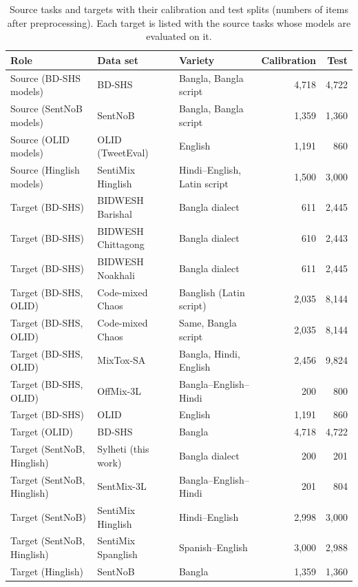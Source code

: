 \begin{table}[t]
\centering
\small
\caption{Source tasks and targets with their calibration and test splits (numbers of items after preprocessing).
Each target is listed with the source tasks whose models are evaluated on it.}
\label{tab:data}
\small
\setlength{\tabcolsep}{3.5pt}
\begin{tabular}{lllrr}
\toprule
Role & Data set & Variety & Calibration & Test \\
\midrule
Source (BD-SHS models) & BD-SHS & Bangla, Bangla script & 4{,}718 & 4{,}722 \\
Source (SentNoB models) & SentNoB & Bangla, Bangla script & 1{,}359 & 1{,}360 \\
Source (OLID models) & OLID (TweetEval) & English & 1{,}191 & 860 \\
Source (Hinglish models) & SentiMix Hinglish & Hindi--English, Latin script & 1{,}500 & 3{,}000 \\
\midrule
Target (BD-SHS) & BIDWESH Barishal & Bangla dialect & 611 & 2{,}445 \\
Target (BD-SHS) & BIDWESH Chittagong & Bangla dialect & 610 & 2{,}443 \\
Target (BD-SHS) & BIDWESH Noakhali & Bangla dialect & 611 & 2{,}445 \\
Target (BD-SHS, OLID) & Code-mixed Chaos & Banglish (Latin script) & 2{,}035 & 8{,}144 \\
Target (BD-SHS, OLID) & Code-mixed Chaos & Same, Bangla script & 2{,}035 & 8{,}144 \\
Target (BD-SHS, OLID) & MixTox-SA & Bangla, Hindi, English & 2{,}456 & 9{,}824 \\
Target (BD-SHS, OLID) & OffMix-3L & Bangla--English--Hindi & 200 & 800 \\
Target (BD-SHS) & OLID & English & 1{,}191 & 860 \\
Target (OLID) & BD-SHS & Bangla & 4{,}718 & 4{,}722 \\
\midrule
Target (SentNoB, Hinglish) & Sylheti (this work) & Bangla dialect & 200 & 201 \\
Target (SentNoB, Hinglish) & SentMix-3L & Bangla--English--Hindi & 201 & 804 \\
Target (SentNoB) & SentiMix Hinglish & Hindi--English & 2{,}998 & 3{,}000 \\
Target (SentNoB, Hinglish) & SentiMix Spanglish & Spanish--English & 3{,}000 & 2{,}988 \\
Target (Hinglish) & SentNoB & Bangla & 1{,}359 & 1{,}360 \\
\bottomrule
\end{tabular}
\end{table}


